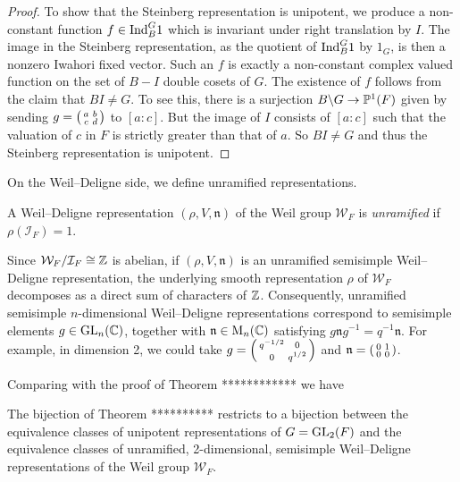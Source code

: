 \begin{proof}
    To show that the Steinberg representation is unipotent, we produce a non-constant function $f \in \mathrm{Ind}_B^G 1$ which is invariant under right translation by $I$. The image in the Steinberg representation, as the quotient of $\mathrm{Ind}_B^G 1$ by $1_G$, is then a nonzero Iwahori fixed vector. Such an $f$ is exactly a non-constant complex valued function on the set of $B-I$ double cosets of $G$. The existence of $f$ follows from the claim that $BI \neq G$. To see this, there is a surjection $B \backslash G \to \mathbb{P}^1(F)$ given by sending $g=\begin{psmallmatrix}
        a&b\\c&d
    \end{psmallmatrix}$ to $[a:c]$. But the image of $I$ consists of $[a:c]$ such that the valuation of $c$ in $F$ is strictly greater than that of $a$. So $BI \neq G$ and thus the Steinberg representation is unipotent. 

\end{proof}

On the Weil--Deligne side, we define unramified representations.

\begin{defn}
    A Weil--Deligne representation $(\rho, V, \mathfrak n)$ of the Weil group $\mathcal W_F$ is \textit{unramified} if $\rho(\mathcal I_F)=1$.
\end{defn}
\begin{rem}
    Since $\mathcal W_F/\mathcal I_F \cong \mathbb{Z}$ is abelian, if $(\rho,V,\mathfrak n)$ is an unramified semisimple Weil--Deligne representation, the underlying smooth representation $\rho$ of $\mathcal W_F$ decomposes as a direct sum of characters of $\mathbb{Z}$. Consequently, unramified semisimple $n$-dimensional Weil--Deligne representations correspond to semisimple elements $g \in \mathrm{GL}_n(\mathbb{C})$, together with $\mathfrak n \in \mathrm{M}_n(\mathbb{C})$ satisfying $g \mathfrak n g^{-1} = q^{-1}\mathfrak n$. For example, in dimension 2, we could take $g=\begin{psmallmatrix}
        q^{-1/2} &0\\0&q^{1/2}
    \end{psmallmatrix} $ and $\mathfrak n = \begin{psmallmatrix}
        0&1\\0&0
    \end{psmallmatrix}$.
\end{rem}

Comparing with the proof of Theorem ************ we have

\begin{cor}
    The bijection of Theorem ********** restricts to a bijection between the equivalence classes of unipotent representations of $G=\mathrm{GL}_2(F)$ and the equivalence classes of unramified, 2-dimensional, semisimple Weil--Deligne representations of the Weil group $\mathcal W_F$.    
\end{cor}



